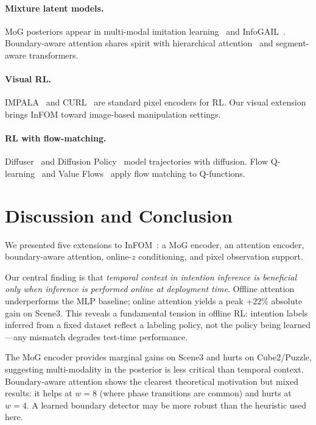 \documentclass{article}
\newcommand{\base}{InFOM}
\begin{document}
\paragraph{Mixture latent models.}
MoG posteriors appear in multi-modal imitation
learning~\citep{hausman2017multimodal} and InfoGAIL~\citep{li2017infogail}.
Boundary-aware attention shares spirit with hierarchical
attention~\citep{yang2016hierarchical} and segment-aware transformers.

\paragraph{Visual RL.}
IMPALA~\citep{espeholt2018impala} and CURL~\citep{laskin2020curl}
are standard pixel encoders for RL.
Our visual extension brings \base{} toward image-based manipulation settings.

\paragraph{RL with flow-matching.}
Diffuser~\citep{janner2022diffuser} and Diffusion
Policy~\citep{chi2023diffusionpolicy} model trajectories with diffusion.
Flow Q-learning~\citep{park2025flowq} and Value
Flows~\citep{dong2025valueflows} apply flow matching to Q-functions.

\section{Discussion and Conclusion}
\label{sec:conclusion}

We presented five extensions to \base{}~\citep{zheng2025infom}:
a MoG encoder, an attention encoder, boundary-aware attention,
online-$z$ conditioning, and pixel observation support.

Our central finding is that \emph{temporal context in intention inference
is beneficial only when inference is performed online at deployment time}.
Offline attention underperforms the MLP baseline; online attention
yields a peak $+22\%$ absolute gain on Scene3.
This reveals a fundamental tension in offline RL:
intention labels inferred from a fixed dataset reflect a labeling
policy, not the policy being learned---any mismatch degrades test-time performance.

The MoG encoder provides marginal gains on Scene3 and hurts on Cube2/Puzzle,
suggesting multi-modality in the posterior is less critical than temporal context.
Boundary-aware attention shows the clearest theoretical motivation
but mixed results: it helps at $w=8$ (where phase transitions are common)
and hurts at $w=4$.
A learned boundary detector may be more robust than the heuristic used here.
\end{document}
